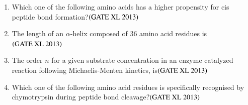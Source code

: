 \documentclass[journal]{IEEEtran}
\begin{document}
\begin{enumerate}
\item Which one of the following amino acids has a higher propensity for cis peptide bond formation?\hfill $\left(\text{GATE XL 2013}\right)$
\begin{enumerate}
\end{enumerate}

\item The length of an $\alpha$-helix composed of 36 amino acid residues is\hfill $\left(\text{GATE XL 2013}\right)$
\begin{enumerate}
\end{enumerate}

\item The order $n$ for a given substrate concentration in an enzyme catalyzed reaction following Michaelis-Menten kinetics, is\hfill $\left(\text{GATE XL 2013}\right)$
\begin{enumerate}
\end{enumerate}

\item Which one of the following amino acid residues is specifically recognised by chymotrypsin during peptide bond cleavage?\hfill $\left(\text{GATE XL 2013}\right)$
\begin{enumerate}
\end{enumerate}


\end{enumerate}
\end{document}
